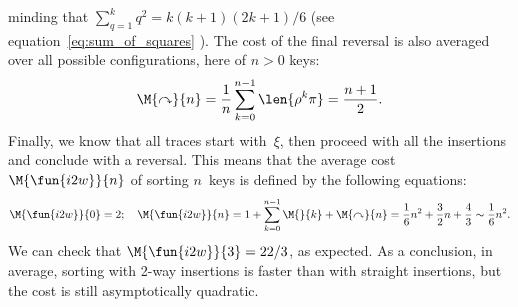 minding that \(\sum_{q=1}^{k}{q^2} = k(k+1)(2k+1)/6\) (see
equation~\eqref{eq:sum_of_squares} ). The
cost of the final reversal is also averaged over all possible
configurations, here of \(n>0\) keys:
\begin{equation*}
\M{\curvearrowright}{n} = \frac{1}{n}\sum_{k=0}^{n-1}\len{\rho^k\pi}
                        = \frac{n+1}{2}.
\end{equation*}
Finally, we know that all traces start with~\(\xi\), then proceed with
all the insertions and conclude with a reversal. This means that the
average cost \(\M{\fun{i2w}}{n}\) of
sorting \(n\)~keys is defined by the following equations:
\begin{equation*}
\M{\fun{i2w}}{0} = 2;\quad
\M{\fun{i2w}}{n} = 1 + \sum_{k=0}^{n-1}{\M{}{k}} + \M{\curvearrowright}{n}
                 = \frac{1}{6}n^2 + \frac{3}{2}n + \frac{4}{3}
                 \sim \frac{1}{6}n^2.
\end{equation*}
We can check that \(\M{\fun{i2w}}{3} = 22/3\), as expected. As a
conclusion, in average, sorting with 2-way insertions is faster than
with straight insertions, but the cost is still asymptotically
quadratic.


